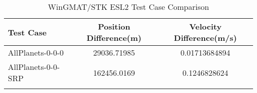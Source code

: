 \begin{table}[htbp!]
\centering
\caption{ WinGMAT/STK ESL2 Test Case Comparison}
      \begin{tabular}{lcc}
      \hline\hline
          Test Case & Position Difference(m) & Velocity Difference(m/s) \\
         \hline
         AllPlanets-0-0-0 & 29036.71985 & 0.01713684894 \\
         AllPlanets-0-0-SRP & 162456.0169 & 0.1246828624 \\
      \hline\hline
      \label{Table: ESL2 WinGMAT-STK Table} 
\end{tabular}
\end{table}
